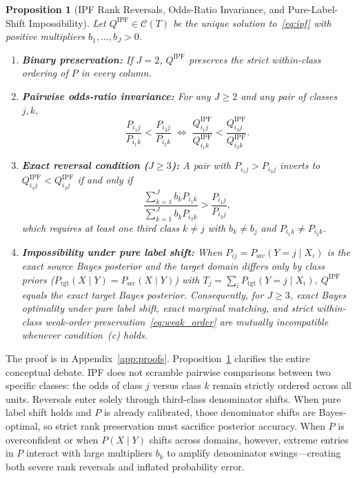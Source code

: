 \documentclass[11pt]{article}
\newtheorem{proposition}{Proposition}
\begin{document}
\begin{proposition}[IPF Rank Reversals, Odds-Ratio Invariance, and Pure-Label-Shift Impossibility]
\label{prop:ipf}
Let $Q^{\mathrm{IPF}} \in \mathcal{C}(T)$ be the unique solution to~\eqref{eq:ipf} with positive multipliers $b_1,\dots,b_J > 0$.
\begin{enumerate}[label=(\alph*),leftmargin=*,itemsep=2pt]
\item \textbf{Binary preservation:} If $J=2$, $Q^{\mathrm{IPF}}$ preserves the strict within-class ordering of $P$ in every column.
\item \textbf{Pairwise odds-ratio invariance:} For any $J \ge 2$ and any pair of classes $j, k$,
\[
\frac{P_{i_1 j}}{P_{i_1 k}} < \frac{P_{i_2 j}}{P_{i_2 k}}
\;\Longleftrightarrow\;
\frac{Q^{\mathrm{IPF}}_{i_1 j}}{Q^{\mathrm{IPF}}_{i_1 k}} < \frac{Q^{\mathrm{IPF}}_{i_2 j}}{Q^{\mathrm{IPF}}_{i_2 k}}.
\]
\item \textbf{Exact reversal condition ($J \ge 3$):} A pair with $P_{i_1 j} > P_{i_2 j}$ inverts to $Q^{\mathrm{IPF}}_{i_1 j} < Q^{\mathrm{IPF}}_{i_2 j}$ if and only if
\[
\frac{\sum_{k=1}^J b_k P_{i_1 k}}{\sum_{k=1}^J b_k P_{i_2 k}} > \frac{P_{i_1 j}}{P_{i_2 j}},
\]
which requires at least one third class $k \ne j$ with $b_k \ne b_j$ and $P_{i_1 k} \ne P_{i_2 k}$.
\item \textbf{Impossibility under pure label shift:} When $P_{ij} = P_{\mathrm{src}}(Y=j \mid X_i)$ is the exact source Bayes posterior and the target domain differs only by class priors ($P_{\mathrm{tgt}}(X \mid Y) = P_{\mathrm{src}}(X \mid Y)$) with $T_j = \sum_i P_{\mathrm{tgt}}(Y=j \mid X_i)$, $Q^{\mathrm{IPF}}$ equals the exact target Bayes posterior. Consequently, for $J \ge 3$, exact Bayes optimality under pure label shift, exact marginal matching, and strict within-class weak-order preservation~\eqref{eq:weak_order} are mutually incompatible whenever condition~(c) holds.
\end{enumerate}
\end{proposition}

The proof is in Appendix~\ref{app:proofs}. Proposition~\ref{prop:ipf} clarifies the entire conceptual debate. IPF does not scramble pairwise comparisons between two specific classes: the odds of class $j$ versus class $k$ remain strictly ordered across all units. Reversals enter solely through third-class denominator shifts. When pure label shift holds and $P$ is already calibrated, those denominator shifts are Bayes-optimal, so strict rank preservation must sacrifice posterior accuracy. When $P$ is overconfident or when $P(X \mid Y)$ shifts across domains, however, extreme entries in $P$ interact with large multipliers $b_k$ to amplify denominator swings—creating both severe rank reversals and inflated probability error.
\end{document}
